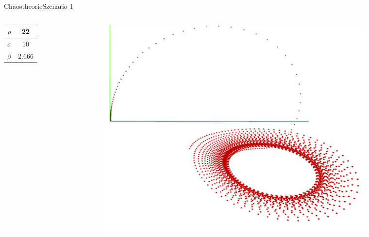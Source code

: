 \documentclass[presentation.tex]{subfiles}
\begin{document}
	
    \begin{frame}{Chaostheorie}{Szenario 1}
    	\begin{columns}
    		\begin{column}{.5\textwidth}
    			\begin{table}
    				\begin{tabular}{ | c | c |}
    					\hline
						 $ \rho $ & 22 \\\hline
						 $ \sigma $ & 10 \\\hline
						 $ \beta $ & 2.666 \\\hline
    				\end{tabular}
    			\end{table}
    		\end{column}
    		\begin{column}{.5\textwidth}
    			\includegraphics[width=\textwidth]{Chaostheorie1}
    		\end{column}
    	\end{columns}
    \end{frame}
\end{document}

